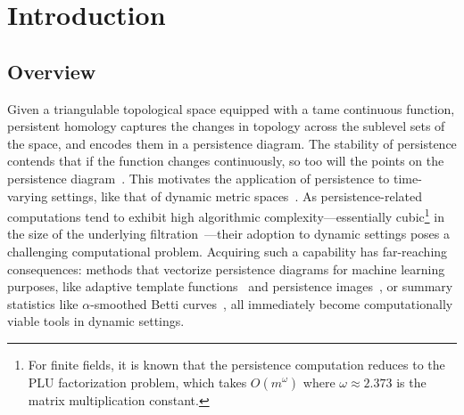 \documentclass[sn-mathphys]{sn-jnl}
\begin{document}
\maketitle

\section{Introduction} 
\subsection{Overview}\label{sec:overview} 
Given a triangulable topological space equipped with a tame continuous function, persistent homology captures the changes in topology across the sublevel sets of the space, and encodes them in a persistence diagram. The stability of persistence contends that   if the function changes continuously, so too will the points on the persistence diagram~\cite{cohen2007stability, cohen2006vines}. 
This motivates the  application of persistence to time-varying  settings, like that of dynamic metric spaces~\cite{kim2020spatiotemporal}. 
As persistence-related computations tend to exhibit high algorithmic complexity---essentially cubic\footnote{For finite fields, it is known that the persistence computation reduces to the PLU factorization problem, which takes $O(m^\omega)$ where $\omega \approx 2.373$ is the matrix multiplication constant.} in the size of the underlying filtration~\cite{morozov2005persistence}---their adoption to dynamic settings poses a challenging computational problem.
Acquiring such a capability has far-reaching consequences: methods that vectorize persistence diagrams for machine learning purposes, like adaptive template functions~\cite{polanco2019adaptive} and persistence images~\cite{adams2017persistence}, or summary statistics like $\alpha$-smoothed Betti curves~\cite{ulmer2019topological}, all immediately become computationally viable tools in dynamic settings. 
  
\end{document}
